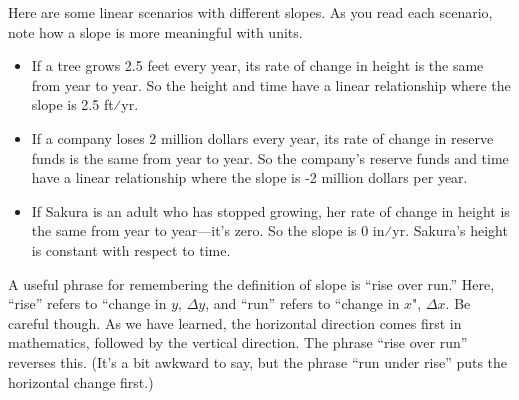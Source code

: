 \documentclass[nooutcomes]{ximera}
\begin{document}
Here are some linear scenarios with different slopes. As you read each scenario, note how a slope is more meaningful with units.
\begin{itemize} 
\item If a tree grows 2.5 feet every year, its rate of change in height is the same from year to year. So the height and time have a linear relationship where the slope is 2.5 ft⁄yr.
\item If a company loses 2 million dollars every year, its rate of change in reserve funds is the same from year to year. So the company's reserve funds and time have a linear relationship where the slope is -2  million dollars per year.
\item If Sakura is an adult who has stopped growing, her rate of change in height is the same from year to year—it's zero. So the slope is 0 in⁄yr. Sakura's height is constant with respect to time.
\end{itemize}


\begin{remark}
A useful phrase for remembering the definition of slope is “rise over run.” Here, “rise” refers to “change in $y$, $\Delta y$, and “run” refers to “change in $x$", $\Delta x$. Be careful though. As we have learned, the horizontal direction comes first in mathematics, followed by the vertical direction. The phrase “rise over run” reverses this. (It's a bit awkward to say, but the phrase “run under rise” puts the horizontal change first.)
\end{remark}
\end{document}
